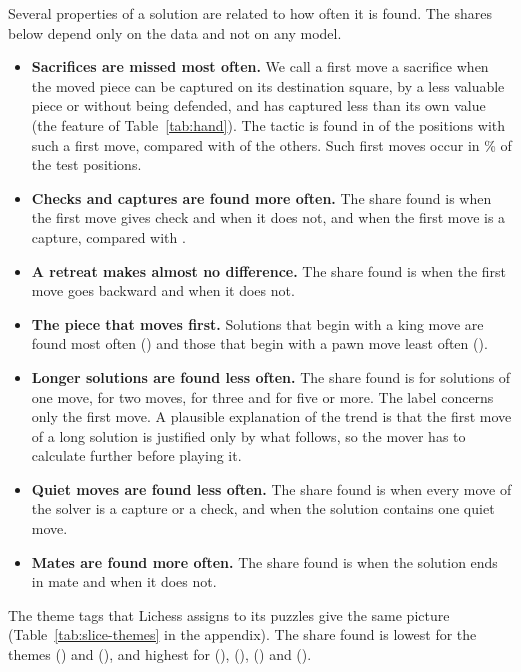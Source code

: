 \documentclass[11pt]{article}
\begin{document}
Several properties of a solution are related to how often it is found. The
shares below depend only on the data and not on any model.
\begin{itemize}
\item \textbf{Sacrifices are missed most often.} We call a first move a
sacrifice when the moved piece can be captured on its destination square, by
a less valuable piece or without being defended, and has captured less than
its own value (the feature  of Table~\ref{tab:hand}).
The tactic is found in  of the positions with
such a first move, compared with  of the
others. Such first moves occur in \% of the test
positions.
\item \textbf{Checks and captures are found more often.} The share found is
 when the first move gives check and
 when it does not, and
 when the first move is a capture, compared
with .
\item \textbf{A retreat makes almost no difference.} The share found is
 when the first move goes backward and
 when it does not.
\item \textbf{The piece that moves first.} Solutions that begin with a king
move are found most often () and those
that begin with a pawn move least often
().
\item \textbf{Longer solutions are found less often.} The share found is
 for solutions of one move,
 for two moves,  for
three and  for five or more. The label concerns
only the first move. A plausible explanation of the trend is that the first
move of a long solution is justified only by what follows, so the mover has
to calculate further before playing it.
\item \textbf{Quiet moves are found less often.} The share found is
 when every move of the solver is a capture or a
check, and  when the solution contains one quiet
move.
\item \textbf{Mates are found more often.} The share found is
 when the solution ends in mate and
 when it does not.
\end{itemize}
The theme tags that Lichess assigns to its puzzles give the same picture
(Table~\ref{tab:slice-themes} in the appendix). The share found is lowest for
the themes  () and
 (), and highest for
 (), 
(), 
() and 
().
\end{document}
